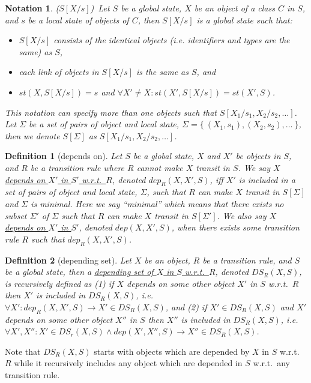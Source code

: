 \documentclass[12pt]{report}
\newtheorem{notation}{Notation}
\newtheorem{definition}{Definition}
\newcommand{\ra}{\rightarrow}
\newcommand{\ul}{\underline}
\begin{document}
\begin{notation}($S[X/s]$)\
Let $S$ be a global state, $X$ be an object of a class $C$ in $S$, and
$s$ be a local state of objects of $C$, then \ul{$S[X/s]$} is a global
state such that:
\begin{itemize}
\item $S[X/s]$ consists of the identical objects (i.e. identifiers and
  types are the same) as $S$,
\item each link of objects in $S[X/s]$ is the same as $S$, and
\item $st(X,S[X/s])=s$ and $\forall X'\ne X:st(X',S[X/s])=st(X',S)$.
\end{itemize}
This notation can specify more than one objects such that
\ul{$S[X_1/s_1,X_2/s_2,\dots]$}.  Let $\Sigma$ be a set of pairs of
object and local state, $\Sigma = \{~ (X_1,s_1), (X_2,s_2), \dots~\}$,
then we denote \ul{$S[\Sigma]$} as $S[X_1/s_1,X_2/s_2,\dots]$.
\end{notation}

\begin{definition}[depends on]
Let $S$ be a global state, $X$ and $X'$ be objects in $S$, and $R$ be
a transition rule where $R$ cannot make $X$ transit in $S$.  We say
\ul{$X$ depends on $X'$ in $S'$ w.r.t.\ $R$}, denoted \ul{$dep_R(X,
  X',S)$}, iff $X'$ is included in a set of pairs of object and local
state, $\Sigma$, such that $R$ can make $X$ transit in $S[\Sigma]$ and
$\Sigma$ is minimal.  Here we say ``minimal'' which means that there
exists no subset $\Sigma'$ of $\Sigma$ such that $R$ can make $X$
transit in $S[\Sigma']$. We also say \ul{$X$ depends on $X'$ in $S'$},
denoted \ul{$dep(X, X',S)$}, when there exists some transition rule
$R$ such that $dep_R(X,X',S)$.
\end{definition}

\begin{definition}[depending set]
Let $X$ be an object, $R$ be a transition rule, and $S$ be a global
state, then a \ul{depending set of $X$ in $S$ w.r.t.\ $R$}, denoted
\ul{$DS_R(X,S)$}, is recursively defined as (1) if $X$ depends on some
other object $X'$ in $S$ w.r.t.\ $R$ then $X'$ is included in
$DS_R(X,S)$, i.e. $\forall X': dep_R(X,X',S) \ra X'\in DS_R(X,S)$, and
(2) if $X' \in DS_R(X,S)$ and $X'$ depends on some other object $X''$
in $S$ then $X''$ is included in $DS_R(X,S)$, i.e. $\forall
X',X'':X'\in DS_r(X,S) \land dep(X',X'',S) \ra X''\in DS_R(X,S)$.
\end{definition}
Note that $DS_R(X,S)$ starts with objects which are depended by $X$ in
$S$ w.r.t.\ $R$ while it recursively includes any object which are
depended in $S$ w.r.t.\ any transition rule.
\end{document}

